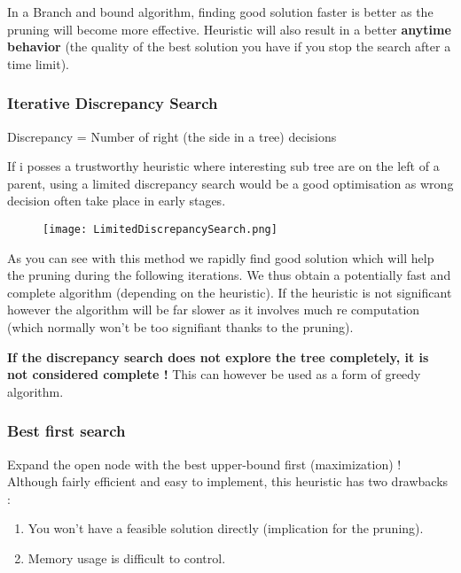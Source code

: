 In a Branch and bound algorithm, finding good solution faster is better 
as the pruning will become more effective.
Heuristic will also result in a better \textbf{anytime behavior} (the quality of the best
solution you have if you stop the search after a time limit).  \newline

\subsubsection{Iterative Discrepancy Search}

Discrepancy = Number of right (the side in a tree) decisions

If i posses a trustworthy heuristic where interesting sub tree are on the left of a parent,
using a limited discrepancy search would be a good optimisation as wrong decision often
take place in early stages.

\begin{figure}[!ht]
    \centering
    \texttt{[image: LimitedDiscrepancySearch.png]}
    \label{fig:Knapsack_example}
\end{figure}
\FloatBarrier

As you can see with this method we rapidly find good solution which will help the pruning
during the following iterations. We thus obtain a potentially fast and complete algorithm
(depending on the heuristic). If the heuristic is not significant however the algorithm will
be far slower as it involves much re computation (which normally won't be too signifiant
thanks to the pruning).\newline

\textbf{If the discrepancy search does not explore the tree completely, 
it is not considered complete !} This can however be used as a form of greedy
algorithm.

\subsubsection{Best first search}

Expand the open node with the best upper-bound first (maximization) !
Although fairly efficient and easy to implement, this heuristic has two drawbacks :

\begin{enumerate}
	\item You won't have a feasible solution directly (implication for the pruning).
	\item Memory usage is difficult to control.
\end{enumerate}

